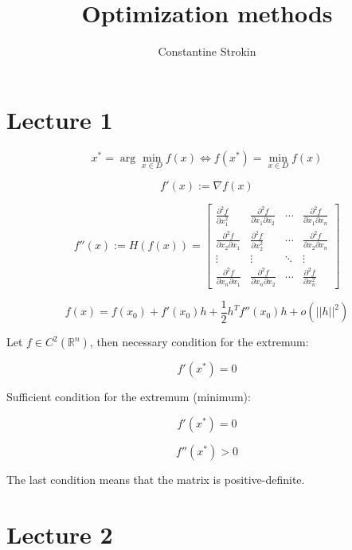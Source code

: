 \documentclass{article}
\title{Optimization methods}
\author{Constantine Strokin}
\date{}
\begin{document}
\maketitle

\section{Lecture 1}


\[  
x^* = \arg\min_{x \in D} f(x) \iff f(x^*) = \min_{x \in D}{f(x)}
\]

\[
f'(x) := \nabla f(x)
\]

\[  
f''(x) := H(f(x)) = \begin{bmatrix}  
\frac{\partial^2 f}{\partial x_1^2} & \frac{\partial^2 f}{\partial x_1 \partial x_2} & \cdots & \frac{\partial^2 f}{\partial x_1 \partial x_n} \\
\frac{\partial^2 f}{\partial x_2 \partial x_1} & \frac{\partial^2 f}{\partial x_2^2} & \cdots & \frac{\partial^2 f}{\partial x_2 \partial x_n} \\
\vdots & \vdots & \ddots & \vdots \\
\frac{\partial^2 f}{\partial x_n \partial x_1} & \frac{\partial^2 f}{\partial x_n \partial x_2} & \cdots & \frac{\partial^2 f}{\partial x_n^2}  
\end{bmatrix}  
\] 

\[  
f(x) = f(x_0) + f'(x_0)h + \frac{1}{2}h^Tf''(x_0)h + o(||h||^2)  
\] 

Let $f \in C^2( \mathbb{R}^n)$, then necessary condition for the extremum:

\[
f'(x^*) = 0
\]

Sufficient condition for the extremum (minimum):

\[
f'(x^*) = 0
\]

\[
f''(x^*) > 0
\]

The last condition means that the matrix is positive-definite.

\section{Lecture 2}
\end{document}
